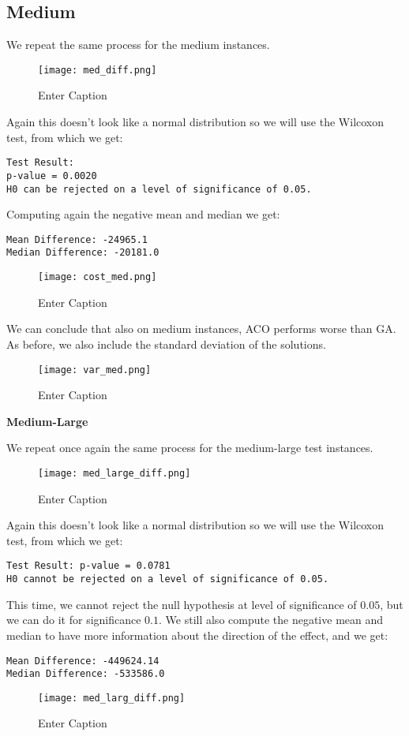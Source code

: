 \documentclass{article}
\begin{document}
\subsection{Medium}

We repeat the same process for the medium instances.
\begin{figure}[H]
    \centering
    \texttt{[image: med\_diff.png]}
    \caption{Enter Caption}
    \label{fig:enter-label}
\end{figure}
Again this doesn't look like a normal distribution so we will use the Wilcoxon test, from which we get:
\begin{verbatim}
Test Result: 
p-value = 0.0020 
H0 can be rejected on a level of significance of 0.05. 
\end{verbatim}
Computing again the negative mean and median we get:
\begin{verbatim}
Mean Difference: -24965.1 
Median Difference: -20181.0 
\end{verbatim}
\begin{figure}[H]
    \centering
    \texttt{[image: cost\_med.png]}
    \caption{Enter Caption}
    \label{fig:enter-label}
\end{figure}

We can conclude that also on medium instances, ACO performs worse than GA.
As before, we also include the standard deviation of the solutions.

\begin{figure}[H]
    \centering
    \texttt{[image: var\_med.png]}
    \caption{Enter Caption}
    \label{fig:enter-label}
\end{figure}

\textbf{Medium-Large}

We repeat once again the same process for the medium-large test instances.
\begin{figure}[H]
    \centering
    \texttt{[image: med\_large\_diff.png]}
    \caption{Enter Caption}
    \label{fig:enter-label}
\end{figure}

Again this doesn't look like a normal distribution so we will use the Wilcoxon test, from which we get:
\begin{verbatim}
Test Result: p-value = 0.0781 
H0 cannot be rejected on a level of significance of 0.05. 
\end{verbatim}
This time, we cannot reject the null hypothesis at level of significance of $0.05$, but we can do it for significance $0.1$. We still also compute the negative mean and median to have more information about the direction of the effect, and we get:
\begin{verbatim}
Mean Difference: -449624.14 
Median Difference: -533586.0 
\end{verbatim}
\begin{figure}[H]
    \centering
    \texttt{[image: med\_larg\_diff.png]}
    \caption{Enter Caption}
    \label{fig:enter-label}
\end{figure}
\end{document}
